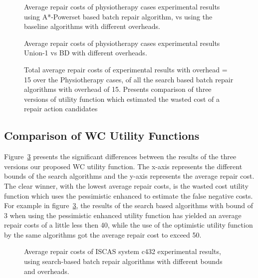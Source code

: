 \documentclass[a4paper,11pt]{report}
\newcommand\roni[1]{\textcolor{green}{roni: #1}}
\begin{document}
\begin{figure}{}
  \caption{Average repair costs of physiotherapy cases experimental results using A*-Powerset based batch repair algorithm, vs using the baseline algorithms with different overheads.}
  \label{fig:P-batch-base}
\end{figure}

\begin{figure}{}
  \caption{Average repair costs of physiotherapy cases experimental results Union-1 vs BD with different overheads.}
  \label{fig:P-BD-UK}
\end{figure}

\begin{figure}{}
  \caption{Total average repair costs of experimental results with overhead = 15 over the Physiotherapy cases, of all the search based batch repair algorithms with overhead of 15. Presents comparison of three versions of utility function which estimated the wasted cost of a repair action candidates}
  \label{fig:P-obj-15}
\end{figure}

\subsection{Comparison of WC Utility Functions}
Figure~\ref{fig:P-obj-15} presents the significant differences between the results of the three versions our proposed WC utility function. The x-axis represents the different bounds of the search algorithms and the y-axis represents the average repair cost.
The clear winner, with the lowest average repair costs, is the wasted cost utility function which uses the pessimistic enhanced to estimate the false negative costs. 
For example in figure~\ref{fig:P-obj-15}, the results of the search based algorithms with bound of 3 when using the pessimistic enhanced utility function has yielded an average repair costs of a little less then 40, while the use of the optimistic utility function by the same algorithms got the average repair cost to exceed 50.

\begin{figure}{}
  \caption{Average repair costs of ISCAS system c432 experimental results, using search-based batch repair algorithms with different bounds and overheads.}
  \label{fig:I-bound-c432}
\end{figure}
\end{document}
